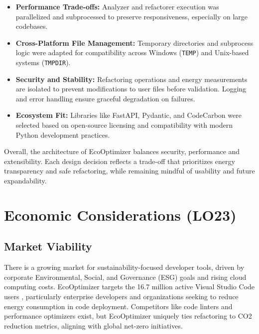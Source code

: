 \documentclass{article}
\begin{document}
\begin{itemize}
    \item \textbf{Performance Trade-offs:} Analyzer and refactorer execution was parallelized and subprocessed to preserve responsiveness, especially on large codebases.
    
    \item \textbf{Cross-Platform File Management:} Temporary directories and subprocess logic were adapted for compatibility across Windows (\texttt{TEMP}) and Unix-based systems (\texttt{TMPDIR}).
    
    \item \textbf{Security and Stability:} Refactoring operations and energy measurements are isolated to prevent modifications to user files before validation. Logging and error handling ensure graceful degradation on failures.
    
    \item \textbf{Ecosystem Fit:} Libraries like FastAPI, Pydantic, and CodeCarbon were selected based on open-source licensing and compatibility with modern Python development practices.
\end{itemize}

\noindent Overall, the architecture of EcoOptimizer balances security, performance and extensibility. Each design decision reflects a trade-off that prioritizes energy transparency and safe refactoring, while remaining mindful of usability and future expandability.

\section{Economic Considerations (LO23)}



\subsection{Market Viability}
There is a growing market for sustainability-focused developer tools, 
driven by corporate Environmental, Social, and Governance (ESG) goals 
and rising cloud computing costs. EcoOptimizer targets the 16.7 million 
active Visual Studio Code users \cite{vscodeUsers}, 
particularly enterprise developers and organizations seeking to reduce 
energy consumption in code deployment. Competitors like code linters and 
performance optimizers exist, but EcoOptimizer 
uniquely ties refactoring 
to CO2 reduction metrics, aligning with global net-zero initiatives.
\end{document}

